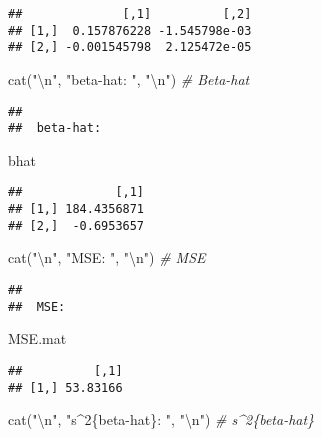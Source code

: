 \documentclass[
]{article}
\newenvironment{Shaded}{\begin{snugshade}}{\end{snugshade}}
\newcommand{\CommentTok}[1]{\textcolor[rgb]{0.56,0.35,0.01}{\textit{#1}}}
\newcommand{\FunctionTok}[1]{\textcolor[rgb]{0.00,0.00,0.00}{#1}}
\newcommand{\NormalTok}[1]{#1}
\newcommand{\SpecialCharTok}[1]{\textcolor[rgb]{0.00,0.00,0.00}{#1}}
\newcommand{\StringTok}[1]{\textcolor[rgb]{0.31,0.60,0.02}{#1}}
\begin{document}
\begin{verbatim}
##              [,1]          [,2]
## [1,]  0.157876228 -1.545798e-03
## [2,] -0.001545798  2.125472e-05
\end{verbatim}

\begin{Shaded}
\begin{Highlighting}[]
\FunctionTok{cat}\NormalTok{(}\StringTok{"}\SpecialCharTok{\textbackslash{}n}\StringTok{"}\NormalTok{, }\StringTok{"beta{-}hat: "}\NormalTok{, }\StringTok{"}\SpecialCharTok{\textbackslash{}n}\StringTok{"}\NormalTok{) }\CommentTok{\# Beta{-}hat}
\end{Highlighting}
\end{Shaded}

\begin{verbatim}
## 
##  beta-hat:
\end{verbatim}

\begin{Shaded}
\begin{Highlighting}[]
\NormalTok{bhat}
\end{Highlighting}
\end{Shaded}

\begin{verbatim}
##             [,1]
## [1,] 184.4356871
## [2,]  -0.6953657
\end{verbatim}

\begin{Shaded}
\begin{Highlighting}[]
\FunctionTok{cat}\NormalTok{(}\StringTok{"}\SpecialCharTok{\textbackslash{}n}\StringTok{"}\NormalTok{, }\StringTok{"MSE: "}\NormalTok{, }\StringTok{"}\SpecialCharTok{\textbackslash{}n}\StringTok{"}\NormalTok{) }\CommentTok{\# MSE}
\end{Highlighting}
\end{Shaded}

\begin{verbatim}
## 
##  MSE:
\end{verbatim}

\begin{Shaded}
\begin{Highlighting}[]
\NormalTok{MSE.mat}
\end{Highlighting}
\end{Shaded}

\begin{verbatim}
##          [,1]
## [1,] 53.83166
\end{verbatim}

\begin{Shaded}
\begin{Highlighting}[]
\FunctionTok{cat}\NormalTok{(}\StringTok{"}\SpecialCharTok{\textbackslash{}n}\StringTok{"}\NormalTok{, }\StringTok{"s\^{}2\{beta{-}hat\}: "}\NormalTok{, }\StringTok{"}\SpecialCharTok{\textbackslash{}n}\StringTok{"}\NormalTok{) }\CommentTok{\# s\^{}2\{beta{-}hat\}}
\end{Highlighting}
\end{Shaded}
\end{document}
